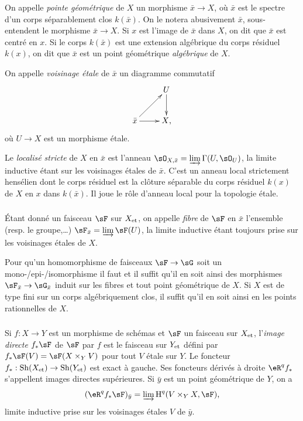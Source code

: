 On appelle \emph{pointe géométrique} de $X$ un morphisme $\bar x\to X$, où 
$\bar x$ est le spectre d'un corps séparablement clos $k(\bar x)$. On le notera 
abusivement $\bar x$, sous-entendent le morphisme $\bar x\to X$. Si $x$ est 
l'image de $\bar x$ dans $X$, on dit que $\bar x$ est centré en $x$. Si le 
corps $k(\bar x)$ est une extension algébrique du corps résiduel $k(x)$, on dit 
que $\bar x$ est un point géométrique \emph{algébrique} de $X$. 

On appelle \emph{voisinage étale} de $\bar x$ un diagramme commutatif 
\[\xymatrix{
  & U \ar[d] \\
  \bar x \ar[ur] \ar[r] 
  & X\text{,}
}\]
où $U\to X$ est un morphisme étale. 

Le \emph{localisé stricte} de $X$ en $\bar x$ est l'anneau 
$\sO_{X,\bar x} = \varinjlim \Gamma(U,\sO_U)$, la limite inductive étant sur les 
voisinages étales de $\bar x$. C'est un anneau local strictement hensélien dont 
le corps résiduel est la clôture séparable du corps résiduel $k(x)$ de $X$ en 
$x$ dans $k(\bar x)$. Il joue le rôle d'anneau local pour la topologie étale. 





\subsubsection{}\label{I:2-3-2}

Étant donné un faisceau $\sF$ sur ${X}_{\textnormal{et}}$, on appelle \emph{fibre} de $\sF$ en 
$\bar x$ l'ensemble (resp. le groupe,\dots) $\sF_{\bar x}=\varinjlim \sF(U)$, 
la limite inductive étant toujours prise sur les voisinages étales de  $X$. 

Pour qu'un homomorphisme de faisceaux $\sF\to \sG$ soit un 
mono-/epi-/isomorphisme il faut et il suffit qu'il en soit ainsi des morphismes 
$\sF_{\bar x}\to \sG_{\bar x}$ induit sur les fibres et tout point géométrique 
de $X$. Si $X$ est de type fini sur un corps algébriquement clos, il suffit 
qu'il en soit ainsi en les points rationnelles de $X$. 





\subsubsection{}\label{I:2-3-3}

Si $f:X\to Y$ est un morphisme de schémas et $\sF$ un faisceau sur ${X}_{\textnormal{et}}$, 
l'\emph{image directe} $f_* \sF$ de $\sF$ par $f$ est le faisceau sur ${Y}_{\textnormal{et}}$ 
défini par $f_* \sF(V) = \sF(X\times_Y V)$ pour tout $V$ étale sur $Y$. Le foncteur 
$f_*:\operatorname{Sh}({X}_{\textnormal{et}})\to \operatorname{Sh}({Y}_{\textnormal{et}})$ est exact à gauche. Ses foncteurs 
dérivés à droite $\eR^q f_*$ s'appellent images directes supérieures. Si 
$\bar y$ est un point géométrique de $Y$, on a 
\[
  (\eR^q f_* \sF)_{\bar y} = \varinjlim \h^q(V\times_Y X,\sF)\text{,}
\]
limite inductive prise sur les voisinages étales $V$ de $\bar y$. 

